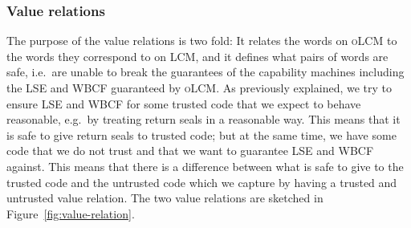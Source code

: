 \documentclass[acmsmall,review,anonymous]{acmart}\settopmatter{printfolios=true,printccs=false,printacmref=false}
\newcommand{\xjmpres}[1]{\plainfun{xjmpRes}{#1}}
\newcommand{\trgcm}{\textsc{LCM}}
\newcommand{\srccm}{\textsc{oLCM}}
\newcommand{\extend}[1]{}
\begin{document}

\subsubsection{Value relations}
The purpose of the value relations is two fold: It relates the words on \srccm{} to the words they correspond to on \trgcm{}, and it defines what pairs of words are safe, i.e.\ are unable to break the guarantees of the capability machines including the LSE and WBCF guaranteed by \srccm{}.
As previously explained, we try to ensure LSE and WBCF for some trusted code that we expect to behave reasonable, e.g.\ by treating return seals in a reasonable way.
This means that it is safe to give return seals to trusted code; but at the same time, we have some code that we do not trust and that we want to guarantee LSE and WBCF against.
This means that there is a difference between what is safe to give to the trusted code and the untrusted code which we capture by having a trusted and untrusted value relation.
The two value relations are sketched in Figure~\ref{fig:value-relation}.
\end{document}
